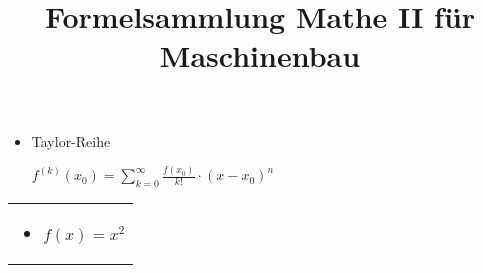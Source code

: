 \documentclass{scrartcl}
\begin{document}
	\title{Formelsammlung Mathe II f\"ur Maschinenbau}
	\date{}
	\author{}
	\maketitle
	
\begin{minipage}{0,45 \textwidth}
	\begin{itemize}
	\item{Taylor-Reihe} 
	
	$f^{(k)}(x_0) = \sum_{k=0}^{\infty} \frac{f(x_0)}{k!} \cdot (x-x_0)^n  $
	\end{itemize}
\end{minipage}%
\hfill
\begin{minipage}{0,45 \textwidth}
	\begin{tabular}{|p{\textwidth}}
		\begin{itemize}
			\item $f(x) = x^2$
		\end{itemize}

\end{tabular}
\end{minipage}%
\end{document}
